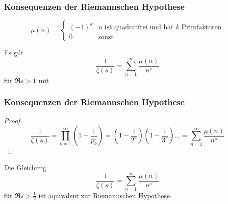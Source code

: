 \begin{frame}
    \frametitle{Konsequenzen der Riemannschen Hypothese}

    \begin{definition}
        \[
            \mu(n) = \begin{cases}
                (-1)^k & n \text{ ist quadratfrei und hat $k$ Primfaktoren}\\
                0 & \text{sonst}
            \end{cases}  
        \]
    \end{definition}
    \begin{lemma}
        Es gilt \[
            \frac{1}{\zeta(s)} = \sum_{n = 1}^{\infty} \frac{\mu(n)}{n^s}  
        \] für $\Re s > 1$ mit
    \end{lemma}
\end{frame}
\begin{frame}
    \frametitle{Konsequenzen der Riemannschen Hypothese}
    \begin{proof}\vspace*{-0.5cm}
        \[
            \frac{1}{\zeta(s)} = \prod_{k=1}^\infty \left(1 - \frac{1}{p_k^s}\right) = \left(1 - \frac{1}{2^s}\right)\left(1 - \frac{1}{3^s}\right) \dots = \sum_{n = 1}^{\infty} \frac{\mu(n)}{n^s} 
        \]
    \end{proof}
    \begin{theorem}
        Die Gleichung \[
            \frac{1}{\zeta(s)} = \sum_{n = 1}^{\infty} \frac{\mu(n)}{n^s}
        \] für $\Re s > \frac{1}{2}$ ist äquivalent zur Riemannschen Hypothese.
    \end{theorem}
\end{frame}